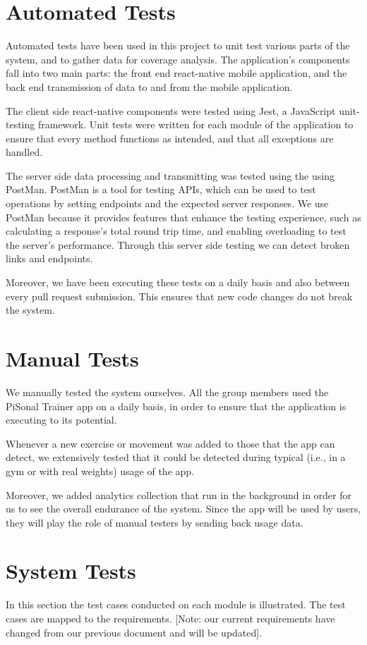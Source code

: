 \documentclass{article}
\begin{document}
\section{Automated Tests}
Automated tests have been used in this project to unit test various parts of the system, and to gather data for coverage analysis. The application’s components fall into two main parts: the front end react-native mobile application, and the back end transmission of data to and from the mobile application. 

The client side react-native components were tested using Jest, a JavaScript unit-testing framework.  Unit tests were written for each module of the application to ensure that every method functions as intended, and that all exceptions are handled.

The server side data processing and transmitting was tested using the using PostMan. PostMan is a tool for testing APIs, which can be used to test operations by setting endpoints and the expected server responses. We use PostMan because it provides features that  enhance the testing experience, such as calculating a response's total round trip time, and enabling overloading to test the server's performance. Through this server side testing we can detect broken links and endpoints.

Moreover, we have been executing these tests on a daily basis and also between every pull request submission. This ensures that new code changes do not break the system.


\section{Manual Tests}
We manually tested the system ourselves. All the group members used the PiSonal Trainer app on a daily basis, in order to ensure that the application is executing to its potential.

Whenever a new exercise or movement was added to those that the app can detect, we extensively tested that it could be detected during typical (i.e., in a gym or with real weights) usage of the app.

Moreover, we added analytics collection that run in the background in order for us to see the overall endurance of the system. Since the app will be used by users, they will play the role of manual testers by sending back usage data.

\section{System Tests}
In this section the test cases conducted on each module is illustrated. The test cases are mapped to the requirements. [Note: our current requirements have changed from our previous document and will be updated].
\end{document}
